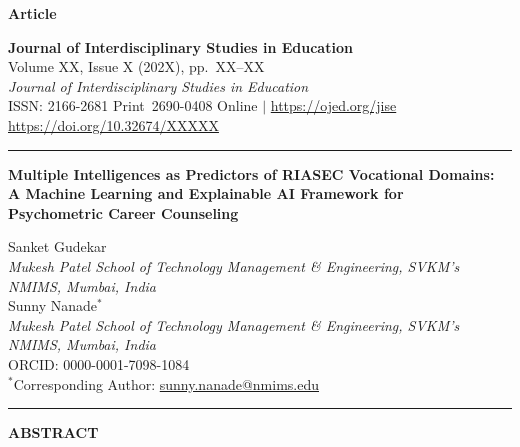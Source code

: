\documentclass[12pt, a4paper]{article}
\begin{document}
\thispagestyle{firstpage}

\noindent\textbf{Article}\hfill
\begin{minipage}[t]{0.72\linewidth}
  \raggedleft\small
  \textcolor{blue!70!black}{\textbf{Journal of Interdisciplinary Studies in Education}}\\
  Volume XX, Issue X (202X), pp.\ XX--XX\\
  \textit{Journal of Interdisciplinary Studies in Education}\\
  ISSN: 2166-2681 Print\ 2690-0408 Online $|$ \url{https://ojed.org/jise}\\
  \url{https://doi.org/10.32674/XXXXX}
\end{minipage}

\noindent\rule{\textwidth}{0.5pt}

\vspace{1.2em}

\begin{center}
{\large\bfseries Multiple Intelligences as Predictors of RIASEC Vocational Domains:\\[3pt]
A Machine Learning and Explainable AI Framework for\\[3pt]
Psychometric Career Counseling}
\end{center}

\vspace{0.6em}

\begin{center}
Sanket Gudekar\\
\textit{Mukesh Patel School of Technology Management \& Engineering, SVKM's NMIMS, Mumbai, India}\\[5pt]
Sunny Nanade$^{*}$\\
\textit{Mukesh Patel School of Technology Management \& Engineering, SVKM's NMIMS, Mumbai, India}\\
ORCID: 0000-0001-7098-1084\\
{\small $^{*}$Corresponding Author: \href{mailto:sunny.nanade@nmims.edu}{sunny.nanade@nmims.edu}}
\end{center}

\vspace{0.6em}
\noindent\rule{\textwidth}{0.4pt}
\vspace{0.3em}

\begin{center}
\textbf{ABSTRACT}
\end{center}
\end{document}
